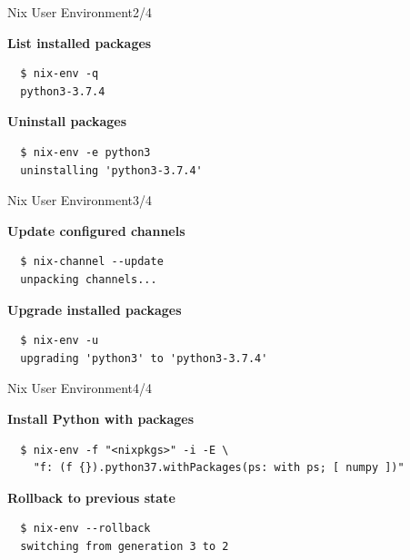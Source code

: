 \documentclass[10pt,aspectratio=169]{beamer}
\begin{document}

\begin{frame}[fragile]{Nix User Environment\hfill2/4}

  \textbf{List installed packages}
  \begin{verbatim}
  $ nix-env -q
  python3-3.7.4
  \end{verbatim}

  \textbf{Uninstall packages}
  \begin{verbatim}
  $ nix-env -e python3
  uninstalling 'python3-3.7.4'
  \end{verbatim}

\end{frame}


\begin{frame}[fragile]{Nix User Environment\hfill3/4}

  \textbf{Update configured channels}
  \begin{verbatim}
  $ nix-channel --update
  unpacking channels...
  \end{verbatim}

  \textbf{Upgrade installed packages}
  \begin{verbatim}
  $ nix-env -u
  upgrading 'python3' to 'python3-3.7.4'
  \end{verbatim}

\end{frame}


\begin{frame}[fragile]{Nix User Environment\hfill4/4}

  \textbf{Install Python with packages}
  \begin{verbatim}
  $ nix-env -f "<nixpkgs>" -i -E \
    "f: (f {}).python37.withPackages(ps: with ps; [ numpy ])"
  \end{verbatim}

  \textbf{Rollback to previous state}
  \begin{verbatim}
  $ nix-env --rollback
  switching from generation 3 to 2
  \end{verbatim}

\end{frame}

\end{document}
